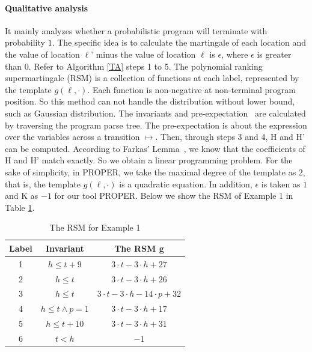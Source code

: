 \documentclass[sigconf,review, anonymous]{acmart}
\begin{document}
\paragraph{Qualitative analysis} It mainly analyzes whether a probabilistic program will terminate with probability $1$. The specific idea is to calculate the martingale of each location and the value of location $\ell$' minus the value of location $\ell$ is $\epsilon$, where $\epsilon$ is greater than $0$. Refer to Algorithm \ref{TA} steps 1 to 5. The polynomial ranking supermartingale (RSM) is a collection of functions at each label, represented by the template $g(\ell,\cdot)$. Each function is non-negative at non-terminal program position. So this method can not handle the distribution without lower bound, such as Gaussian distribution. The invariants and pre-expectation~\cite{Chakarov2013Martingales} are calculated by traversing the program parse tree. The pre-expectation is about the expression over the variables across a transition $\mapsto$. Then, through steps 3 and 4, H and H' can be computed. According to Farkas' Lemma~\cite{Farkas1894}, we know that the coefficients of H and H' match exactly. So we obtain a linear programming problem.  For the sake of simplicity, in PROPER, we take the maximal degree of the template as $2$, that is, the template $g(\ell,\cdot)$ is a quadratic equation. In addition, $\epsilon$ is taken as $1$ and K as $-1$ for our tool PROPER. Below we show the RSM of Example 1 in Table \ref{RSM}. 

\begin{table}[htb]
	\centering
	\caption{The RSM for Example 1}
	\label{RSM}
	\begin{tabular}{|c|c|c|}
		\hline
		Label& Invariant & The RSM g \\ \hline
		1 & $h\leq t+9$ &$3\cdot t-3\cdot h+27$ \\ \hline
		2 & $h\leq t$ &$3\cdot t-3\cdot h+26$ \\ \hline
		3 & $h\leq t$  &$3\cdot t-3\cdot h-14\cdot p+32$ \\ \hline
		4 & $h\leq t\land p=1$ &$3\cdot t-3\cdot h+17$ \\ \hline
		5 & $h\leq t+10$&$3\cdot t-3\cdot h+31$ \\ \hline
		6 & $t<h$ &$-1$ \\ \hline
	\end{tabular}
\end{table}
\end{document}
